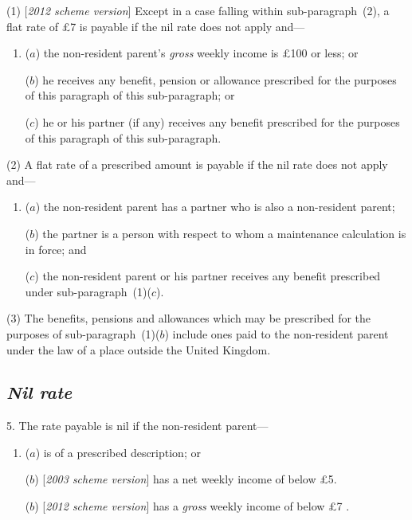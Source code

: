 \documentclass[12pt,a4paper]{article}
\begin{document}
(1) [\emph{2012 scheme version}] Except in a case falling within sub-paragraph~(2), a flat rate of 
£7  %
is payable if the nil rate does not apply and—
\begin{enumerate}\item[]
($a$) the non-resident parent’s 
\emph{gross}  %
weekly income is £100 or less; or

($b$) he receives any benefit, pension or allowance prescribed for the purposes of this paragraph of this sub-paragraph; or

($c$) he or his partner (if any) receives any benefit prescribed for the purposes of this paragraph of this sub-paragraph.
\end{enumerate}

(2) A flat rate of a prescribed amount is payable if the nil rate does not apply and—
\begin{enumerate}\item[]
($a$) the non-resident parent has a partner who is also a non-resident parent;

($b$) the partner is a person with respect to whom a maintenance calculation is in force; and

($c$) the non-resident parent or his partner receives any benefit prescribed under sub-paragraph~(1)($c$).
\end{enumerate}

(3) The benefits, pensions and allowances which may be prescribed for the purposes of sub-paragraph~(1)($b$)  include ones paid to the non-resident parent under the law of a place outside the United Kingdom.


\subsection*{\itshape Nil rate}

5. The rate payable is nil if the non-resident parent—
\begin{enumerate}\item[]
($a$) is of a prescribed description; or

($b$) [\emph{2003 scheme version}] has a net weekly income of below £5.
 
($b$) [\emph{2012 scheme version}] has a 
\emph{gross}  %
weekly income of below 
£7%
. 
\end{enumerate}
\end{document}
